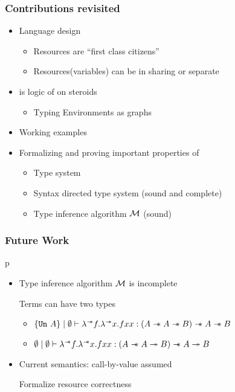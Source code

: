 \begin{frame}
  \frametitle{Contributions revisited}

  \begin{itemize}

  \item {\color{red}Language design}
    \begin{itemize}
    \item {\color{red}Resources are ``first class citizens''}
    \item {\color{red}Resources(variables) can be in sharing or separate}
    \end{itemize}

  \item {\color{red}\qub{} is logic of \BI on steroids}
    \begin{itemize}
    \item {\color{red}Typing Environments as graphs}
    \end{itemize}
  \item {\color{red}Working examples}
  \item Formalizing and proving important properties of \qub{}
    \begin{itemize}
    \item Type system
    \item Syntax directed type system (sound and complete)
    \item Type inference algorithm $\mathcal{M}$ (sound)
    \end{itemize}

  \end{itemize}

\end{frame}

\begin{frame}[fragile, c]
  \frametitle{Future Work}
p  \begin{itemize}
  \item Type inference algorithm $\mathcal{M}{}$ is incomplete

    Terms can have two types
    \begin{itemize}
    \item $\{\texttt{Un}\ A\} \mid \emptyset \vdash \lambda^{\sepimp}f. \lambda^{\sepimp}x. f x x: (A \sepimp A \sepimp B) \sepimp A \sepimp B$
    \item $\emptyset \mid \emptyset \vdash \lambda^{\mathrel{-\mkern-6mu*}}f. \lambda^{\mathrel{-\mkern-6mu*}}x. f x x: (A \mathrel{-\mkern-6mu*} A \twoheadrightarrow B) \mathrel{-\mkern-6mu*} A \twoheadrightarrow B$
    \end{itemize}
  \item Current semantics: call-by-value assumed

    Formalize resource correctness
  \end{itemize}
\end{frame}



